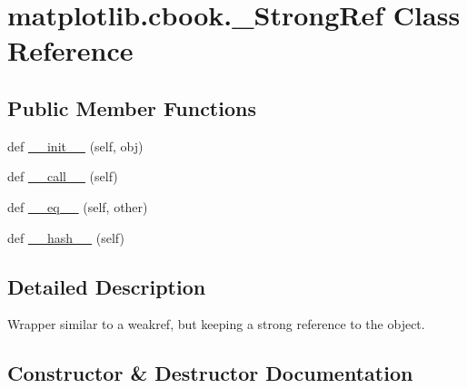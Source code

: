 \hypertarget{classmatplotlib_1_1cbook_1_1__StrongRef}{}\section{matplotlib.\+cbook.\+\_\+\+Strong\+Ref Class Reference}
\label{classmatplotlib_1_1cbook_1_1__StrongRef}
\subsection*{Public Member Functions}
\begin{DoxyCompactItemize}
\item 
def \hyperlink{classmatplotlib_1_1cbook_1_1__StrongRef_a92d986c072d4c376668d0d639052f8e3}{\+\_\+\+\_\+init\+\_\+\+\_\+} (self, obj)
\item 
def \hyperlink{classmatplotlib_1_1cbook_1_1__StrongRef_af795ec3add68664cf8a0da4fafefaa30}{\+\_\+\+\_\+call\+\_\+\+\_\+} (self)
\item 
def \hyperlink{classmatplotlib_1_1cbook_1_1__StrongRef_accbba6787a88b9905a2492f318a54ad7}{\+\_\+\+\_\+eq\+\_\+\+\_\+} (self, other)
\item 
def \hyperlink{classmatplotlib_1_1cbook_1_1__StrongRef_a87a2f6713aa85738a9b967fddc44d5df}{\+\_\+\+\_\+hash\+\_\+\+\_\+} (self)
\end{DoxyCompactItemize}


\subsection{Detailed Description}
\begin{DoxyVerb}Wrapper similar to a weakref, but keeping a strong reference to the object.
\end{DoxyVerb}
 

\subsection{Constructor \& Destructor Documentation}
\mbox{\label{classmatplotlib_1_1cbook_1_1__StrongRef_a92d986c072d4c376668d0d639052f8e3}} 
